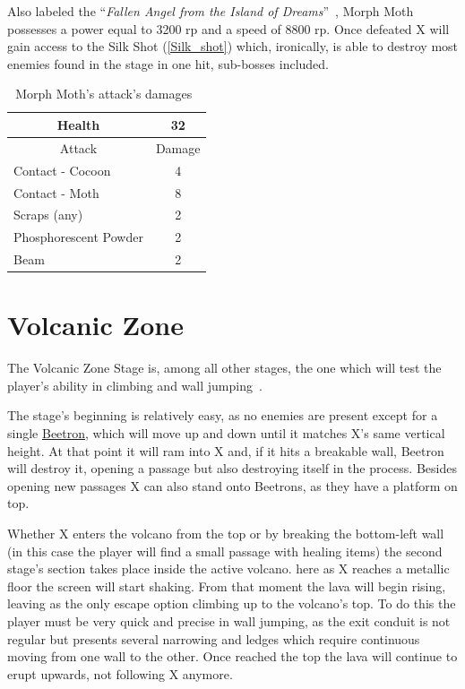 Also labeled the ``\textit{Fallen Angel from the Island of Dreams}''~\cite{book:MMX_Complete_art}, Morph Moth possesses a power equal to 3200 rp and a speed of 8800 rp. Once defeated X will gain access to the Silk Shot (\ref{Silk_shot}) which, ironically, is able to destroy most enemies found in the stage in one hit, sub-bosses included.


\begin{table}[htp]
	\centering
	\begin{tabular}[h]{l c}
		
		\toprule
		\multicolumn{1}{c}{Health}  & 32 \\
		\midrule
		\multicolumn{1}{c}{Attack} & \multicolumn{1}{c}{Damage}\\
		Contact - Cocoon & 4 \\
		Contact - Moth& 8\\
		Scraps (any) & 2\\
		Phosphorescent Powder& 2\\
		Beam & 2\\
		\bottomrule
	\end{tabular}
	\caption{Morph Moth's attack's damages~\cite{wiki:Morph_moth}}
\end{table}

\section{Volcanic Zone}
The Volcanic Zone Stage is, among all other stages, the one which will test the player's ability in climbing and wall jumping~\cite{stratwiki:Volcanic_zone}. 

The stage's beginning is relatively easy, as no enemies are present except for a single \hyperlink{enem:Beetron}{Beetron}, which will move up and down until it matches X’s same vertical height. At that point it will ram into X and, if it hits a breakable wall, Beetron will destroy it, opening a passage but also destroying itself in the process. Besides opening new passages X can also stand onto Beetrons, as they have a platform on top.

Whether X enters the volcano from the top or by breaking the bottom-left wall (in this case the player will find a small passage with healing items) the second stage's section takes place inside the active volcano. here as X reaches a metallic floor the screen will start shaking. From that moment the lava will begin rising, leaving as the only escape option climbing up to the volcano's top. To do this the player must be very quick and precise in wall jumping, as the exit conduit is not regular but presents several narrowing and ledges which require continuous moving from one wall to the other. Once reached the top the lava will continue to erupt upwards, not following X anymore.


